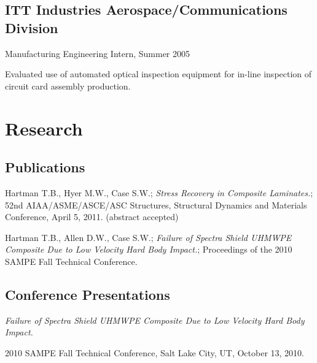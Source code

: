 \documentclass[10pt,letterpaper]{article}
\renewenvironment{itemize}{
  \begin{list}{}{
    \setlength{\leftmargin}{1.5em}
    \setlength{\itemsep}{0.25em}
    \setlength{\parskip}{0pt}
    \setlength{\parsep}{0.25em}
  }
}{
  \end{list}
}
\begin{document}
\subsection*{ITT Industries Aerospace/Communications Division}

\begin{itemize}
\item Manufacturing Engineering Intern, Summer 2005
    \begin{itemize}
    \item Evaluated use of automated optical inspection equipment for in-line inspection of circuit card assembly production.
    \end{itemize}
\end{itemize}

%
%

\section*{Research}

\subsection*{Publications}
\begin{itemize}
\item Hartman T.B., Hyer M.W., Case S.W.; \textit{Stress Recovery in Composite Laminates.}; 52nd AIAA/ASME/ASCE/ASC Structures, Structural Dynamics and Materials Conference, April 5, 2011. (abstract accepted)
\end{itemize}
\begin{itemize}
\item Hartman T.B., Allen D.W., Case S.W.; \textit{Failure of Spectra Shield UHMWPE Composite Due to Low Velocity Hard Body Impact.}; Proceedings of the 2010 SAMPE Fall Technical Conference.
\end{itemize}

\subsection*{Conference Presentations}
\begin{itemize}
\item \textit{Failure of Spectra Shield UHMWPE Composite Due to Low Velocity Hard Body Impact.}
  \begin{itemize}
  \item 2010 SAMPE Fall Technical Conference,
    Salt Lake City, UT,
    October 13, 2010.
  \end{itemize}
\end{itemize}
\end{document}
